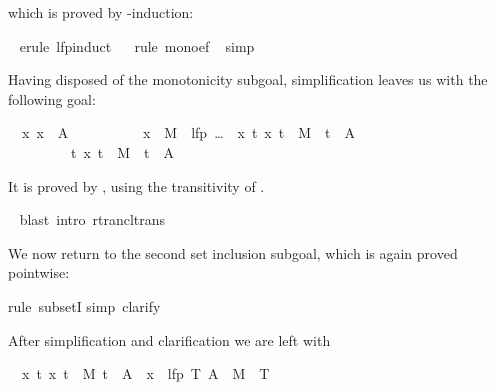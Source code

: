 \begin{isabellebody}
\begin{isamarkuptxt}
\begin{isabelle}
\end{isabelle}
which is proved by -induction:%
\end{isamarkuptxt}%
\ \isamarkuptrue%
erule\ lfp{\isacharunderscore}induct{\isacharparenright}\isanewline
\ \ \isamarkupfalse%
rule\ mono{\isacharunderscore}ef{\isacharparenright}\isanewline
\ \isamarkupfalse%
simp{\isacharparenright}\isamarkupfalse%
%
\begin{isamarkuptxt}%
\noindent
Having disposed of the monotonicity subgoal,
simplification leaves us with the following goal:
\begin{isabelle}
\ {}{\isachardot}\ {\isasymAnd}x{\isachardot}\ x\ {\isasymin}\ A\ {\isasymor}\isanewline
\ \ \ \ \ \ \ \ \ x\ {\isasymin}\ M{\isasyminverse}\ {\isacharbackquote}{\isacharbackquote}\ {\isacharparenleft}lfp\ {\isacharparenleft}\dots{\isacharparenright}\ {\isasyminter}\ {\isacharbraceleft}x{\isachardot}\ {\isasymexists}t{\isachardot}\ {\isacharparenleft}x{\isacharcomma}\ t{\isacharparenright}\ {\isasymin}\ M\isactrlsup {\isacharasterisk}\ {\isasymand}\ t\ {\isasymin}\ A{\isacharbraceright}{\isacharparenright}\isanewline
\ \ \ \ \ \ \ \ {\isasymLongrightarrow}\ {\isasymexists}t{\isachardot}\ {\isacharparenleft}x{\isacharcomma}\ t{\isacharparenright}\ {\isasymin}\ M\isactrlsup {\isacharasterisk}\ {\isasymand}\ t\ {\isasymin}\ A
\end{isabelle}
It is proved by , using the transitivity of 
.%
\end{isamarkuptxt}%
\ \isamarkuptrue%
blast\ intro{\isacharcolon}\ rtrancl{\isacharunderscore}trans{\isacharparenright}\isamarkupfalse%
%
\begin{isamarkuptxt}%
We now return to the second set inclusion subgoal, which is again proved
pointwise:%
\end{isamarkuptxt}%
\isamarkuptrue%
rule\ subsetI{\isacharparenright}\isanewline
\isamarkupfalse%
simp{\isacharcomma}\ clarify{\isacharparenright}\isamarkupfalse%
%
\begin{isamarkuptxt}%
\noindent
After simplification and clarification we are left with
\begin{isabelle}%
\ {}{\isachardot}\ {\isasymAnd}x\ t{\isachardot}\ {\isasymlbrakk}{\isacharparenleft}x{\isacharcomma}\ t{\isacharparenright}\ {\isasymin}\ M\isactrlsup {\isacharasterisk}{\isacharsemicolon}\ t\ {\isasymin}\ A{\isasymrbrakk}\ {\isasymLongrightarrow}\ x\ {\isasymin}\ lfp\ {\isacharparenleft}{\isasymlambda}T{\isachardot}\ A\ {\isasymunion}\ M{\isasyminverse}\ {\isacharbackquote}{\isacharbackquote}\ T{\isacharparenright}%

\end{isabelle}
\end{isamarkuptxt}
\end{isabellebody}

